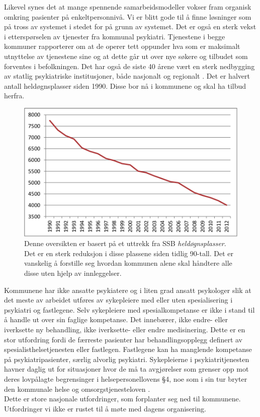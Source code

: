 \documentclass[11pt]{report} %
\begin{document}
    Likevel synes det at mange spennende samarbeidsmodeller vokser fram organisk omkring pasienter på enkeltpersonnivå. Vi er blitt gode til å finne løsninger som på tross av systemet i stedet for på grunn av systemet.
    Det er også en sterk vekst i etterspørselen av tjenester fra kommunal psykiatri. Tjenestene i begge kommuner rapporterer om at de operer tett oppunder hva som er maksimalt utnyttelse av tjenestene sine og at dette går ut over nye søkere og tilbudet som forventes i befolkningen.
    Det har også de siste 40 årene vært en sterk nedbygging av statlig psykiatriske institusjoner, både nasjonalt og regionalt
    \cite{SSButtrekk1}. Det er halvert antall heldøgnsplasser siden 1990. Disse bor nå i kommunene og skal ha tilbud herfra. 

  \begin{figure}[ht]
    \centering
    \includegraphics{./pix/heldgnpsykplass}
    \caption[Oversikt over reduksjon i  \textit{heldøgnsplasser}.]
     {Denne oversikten er basert på et uttrekk fra SSB \textit{heldøgnsplasser}. Det er en sterk reduksjon i disse plassene siden tidlig 90-tall. Det er vanskelig å forstille seg hvordan kommunen alene skal håndtere alle disse uten hjelp av innleggelser.}
  \end{figure}  


      Kommunene har ikke ansatte psykiatere og i liten grad ansatt psykologer slik at det meste av arbeidet utføres av sykepleiere med eller uten spesialisering i psykiatri og fastlegene. Selv sykepleiere med spesialkompetanse er ikke i stand til å handle ut over sin faglige kompetanse. Det innebærer, ikke endre- eller iverksette ny behandling, ikke iverksette- eller endre medisinering. Dette er en stor utfordring fordi de færreste pasienter har behandlingsopplegg definert av spesialisthelsetjenesten eller fastlegen. Fastlegene kan ha manglende kompetanse på psykiatripasienter, særlig alvorlig psykiatri. 
      Sykepleierne i psykiatritjenesten havner daglig ut for situasjoner hvor de må ta avgjørelser som grenser opp mot deres lovpålagte begrensinger i helsepersonellovens §4, noe som i sin tur bryter den kommunale helse og omsorgstjenesteloven
      \cite{HOTJL-12}.\\
      Dette er store nasjonale utfordringer, som forplanter seg ned til kommunene. Utfordringer vi ikke er rustet til å møte med dagens organisering. \\
\end{document}

